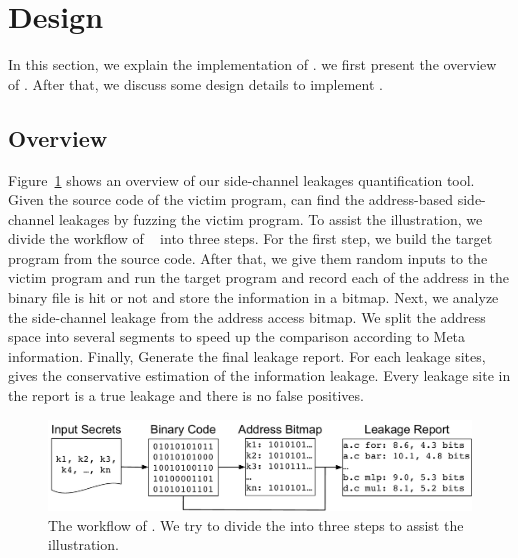 \section{Design}
In this section, we explain the implementation of \tool{}.
we first present the overview of \tool{}. After that, we discuss some design details to implement \tool{}.

\subsection{Overview}
Figure~\ref{fig:workflow} shows an overview of our side-channel leakages quantification tool. Given the source code of the victim program, \tool{} can find the address-based side-channel leakages by fuzzing the victim program. To assist the illustration, we divide the workflow of ~\tool{} into three steps. For the first step, we build the target program from the source code. After that, we give them random inputs to the victim program and run the target program and record each of the address in the binary file is hit or not and store the information in a bitmap. Next, we analyze the side-channel leakage from the address access bitmap. We split the address space into several segments to speed up the comparison according to Meta information. Finally, \tool{} Generate the final leakage report. For each leakage sites, \tool{} gives the conservative estimation of the information leakage. Every leakage site in the report is a true leakage and there is no false positives.

\begin{figure}[ht]
    \centering
    \includegraphics[width=\columnwidth]{./figures/chapter5/workflow.pdf}
    \caption{The workflow of \tool{}. We try to divide the \tool{} into three steps to assist the illustration. }\label{fig:workflow}
\end{figure}

